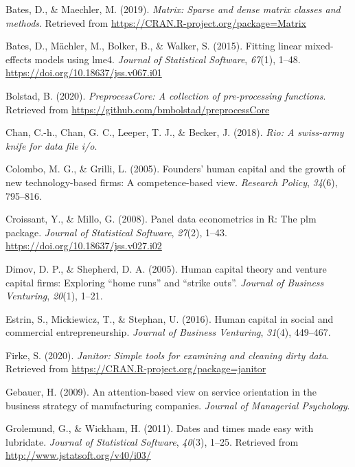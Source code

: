 \documentclass[
  english,
  man]{apa6}
\begin{document}
\leavevmode\hypertarget{ref-R-Matrix}{}%
Bates, D., \& Maechler, M. (2019). \emph{Matrix: Sparse and dense matrix classes and methods}. Retrieved from \url{https://CRAN.R-project.org/package=Matrix}

\leavevmode\hypertarget{ref-R-lme4}{}%
Bates, D., Mächler, M., Bolker, B., \& Walker, S. (2015). Fitting linear mixed-effects models using lme4. \emph{Journal of Statistical Software}, \emph{67}(1), 1--48. \url{https://doi.org/10.18637/jss.v067.i01}

\leavevmode\hypertarget{ref-R-preprocessCore}{}%
Bolstad, B. (2020). \emph{PreprocessCore: A collection of pre-processing functions}. Retrieved from \url{https://github.com/bmbolstad/preprocessCore}

\leavevmode\hypertarget{ref-R-rio}{}%
Chan, C.-h., Chan, G. C., Leeper, T. J., \& Becker, J. (2018). \emph{Rio: A swiss-army knife for data file i/o}.

\leavevmode\hypertarget{ref-colombo2005founders}{}%
Colombo, M. G., \& Grilli, L. (2005). Founders' human capital and the growth of new technology-based firms: A competence-based view. \emph{Research Policy}, \emph{34}(6), 795--816.

\leavevmode\hypertarget{ref-R-plm_a}{}%
Croissant, Y., \& Millo, G. (2008). Panel data econometrics in R: The plm package. \emph{Journal of Statistical Software}, \emph{27}(2), 1--43. \url{https://doi.org/10.18637/jss.v027.i02}

\leavevmode\hypertarget{ref-dimov2005human}{}%
Dimov, D. P., \& Shepherd, D. A. (2005). Human capital theory and venture capital firms: Exploring ``home runs'' and ``strike outs''. \emph{Journal of Business Venturing}, \emph{20}(1), 1--21.

\leavevmode\hypertarget{ref-estrin2016human}{}%
Estrin, S., Mickiewicz, T., \& Stephan, U. (2016). Human capital in social and commercial entrepreneurship. \emph{Journal of Business Venturing}, \emph{31}(4), 449--467.

\leavevmode\hypertarget{ref-R-janitor}{}%
Firke, S. (2020). \emph{Janitor: Simple tools for examining and cleaning dirty data}. Retrieved from \url{https://CRAN.R-project.org/package=janitor}

\leavevmode\hypertarget{ref-gebauer2009attention}{}%
Gebauer, H. (2009). An attention-based view on service orientation in the business strategy of manufacturing companies. \emph{Journal of Managerial Psychology}.

\leavevmode\hypertarget{ref-R-lubridate}{}%
Grolemund, G., \& Wickham, H. (2011). Dates and times made easy with lubridate. \emph{Journal of Statistical Software}, \emph{40}(3), 1--25. Retrieved from \url{http://www.jstatsoft.org/v40/i03/}
\end{document}
